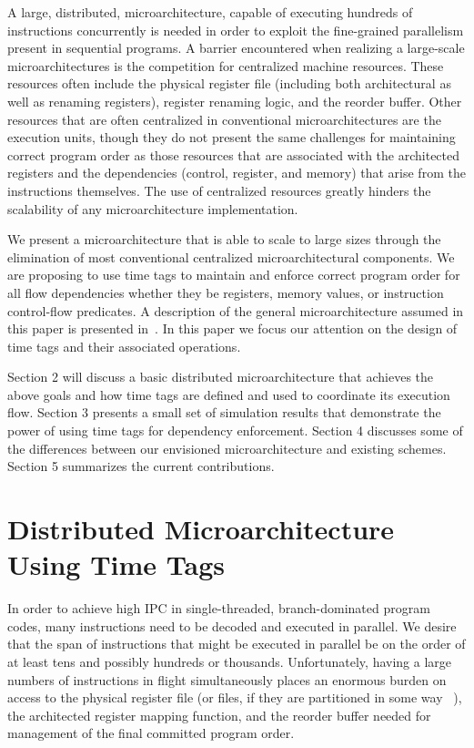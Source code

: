 \documentclass[10pt,dvips]{article}
\begin{document}
A large, distributed, microarchitecture, capable of executing
hundreds of instructions concurrently
is needed in order to exploit the fine-grained parallelism present 
in sequential programs.
A barrier encountered when realizing a large-scale microarchitectures is the
competition for centralized machine resources.
These resources often include the 
physical register file (including both architectural as well as renaming 
registers), register renaming logic,
and the reorder buffer.  Other resources that are often centralized
in conventional microarchitectures are the execution units, though they
do not present the same challenges for maintaining correct program order
as those resources that are associated with the architected registers
and the dependencies (control, register, and memory) that arise
from the instructions themselves.  The use of centralized resources
greatly hinders the scalability of any microarchitecture implementation. 

We present a microarchitecture that is able to scale to large sizes
through the
elimination of most conventional centralized microarchitectural components.
We are proposing to use time tags to maintain 
and enforce correct program order for all flow dependencies whether
they be registers, memory values, or instruction control-flow predicates.
A description of the general microarchitecture
assumed in this paper is presented in~\cite{Uht01}.  
In this paper
we focus our attention on the design of time tags and their
associated operations.

Section 2 will discuss a basic distributed microarchitecture that
achieves the above goals and how time tags are defined and used
to coordinate its execution flow.  
Section 3 presents a small set of simulation results that demonstrate
the power of using time tags for dependency enforcement. 
Section 4 discusses some of the differences between our envisioned
microarchitecture and existing schemes.
Section 5 summarizes the current contributions.
%
%
\section{Distributed Microarchitecture Using Time Tags}
%
In order to achieve high IPC in single-threaded, branch-dominated 
program codes, many instructions need to be decoded and executed
in parallel.  We desire that the span of instructions that might be
executed in parallel be on the order of at least tens and possibly hundreds
or thousands.  
Unfortunately, having a large numbers of instructions
in flight simultaneously places an enormous burden on access to 
the physical register file 
(or files, if they are partitioned in some way ~\cite{Jiser00}),
the architected register mapping function, and the reorder buffer 
needed for
management of the final committed program order.
\end{document}
